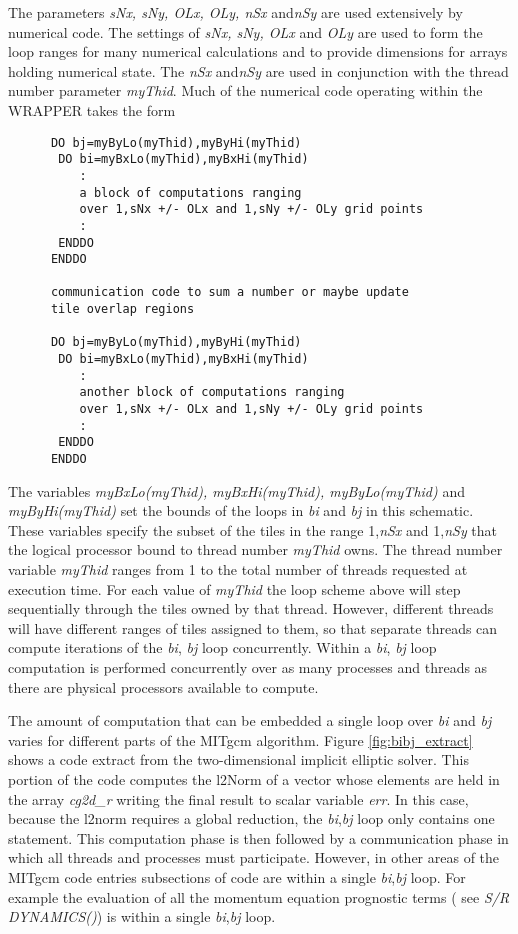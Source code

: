  The parameters {\em sNx, sNy, OLx, OLy, nSx} and{\em nSy} are used extensively by
numerical code. The settings of {\em sNx, sNy, OLx} and {\em OLy}
are used to form the loop ranges for many numerical calculations and
to provide dimensions for arrays holding numerical state.
The {\em nSx} and{\em nSy} are used in conjunction with the thread number
parameter {\em myThid}. Much of the numerical code operating within the
WRAPPER takes the form 
\begin{verbatim}
      DO bj=myByLo(myThid),myByHi(myThid)
       DO bi=myBxLo(myThid),myBxHi(myThid)
          :
          a block of computations ranging 
          over 1,sNx +/- OLx and 1,sNy +/- OLy grid points
          :
       ENDDO
      ENDDO

      communication code to sum a number or maybe update
      tile overlap regions

      DO bj=myByLo(myThid),myByHi(myThid)
       DO bi=myBxLo(myThid),myBxHi(myThid)
          :
          another block of computations ranging 
          over 1,sNx +/- OLx and 1,sNy +/- OLy grid points
          :
       ENDDO
      ENDDO
\end{verbatim}
The variables {\em myBxLo(myThid), myBxHi(myThid), myByLo(myThid)} and {\em
myByHi(myThid)} set the bounds of the loops in {\em bi} and {\em bj} in this 
schematic. These variables specify the subset of the tiles in
the range 1,{\em nSx} and 1,{\em nSy} that the logical processor bound to
thread number {\em myThid} owns. The thread number variable {\em myThid} 
ranges from 1 to the total number of threads requested at execution time.
For each value of {\em myThid} the loop scheme above will step sequentially
through the tiles owned by that thread. However, different threads will
have different ranges of tiles assigned to them, so that separate threads can
compute iterations of the {\em bi}, {\em bj} loop concurrently.
Within a {\em bi}, {\em bj} loop
computation is performed concurrently over as many processes and threads
as there are physical processors available to compute.

The amount of computation that can be embedded
a single loop over {\em bi} and {\em bj} varies for different parts of the
MITgcm algorithm. Figure \ref{fig:bibj_extract} shows a code extract
from the two-dimensional implicit elliptic solver. This portion of the
code computes the l2Norm of a vector whose elements are held in
the array {\em cg2d\_r} writing the final result to scalar variable
{\em err}. In this case, because the l2norm requires a global reduction,
the {\em bi},{\em bj} loop only contains one statement. This computation
phase is then followed by a communication phase in which all threads and
processes must participate. However,
in other areas of the MITgcm code entries subsections of code are within
a single {\em bi},{\em bj} loop. For example the evaluation of all
the momentum equation prognostic terms ( see {\em S/R DYNAMICS()})
is within a single {\em bi},{\em bj} loop.

